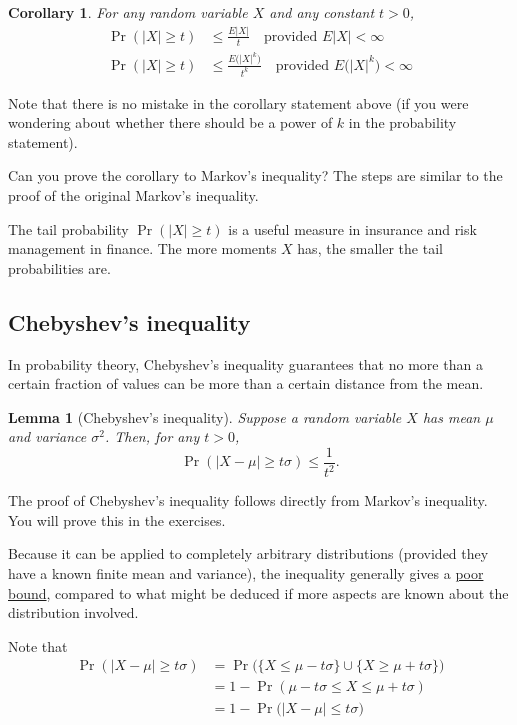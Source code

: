 \documentclass[
]{book}
\newtheorem{lemma}{Lemma}[chapter]
\newtheorem{corollary}{Corollary}[chapter]
\theoremstyle{definition}
\theoremstyle{definition}
\theoremstyle{definition}
\theoremstyle{definition}
\theoremstyle{remark}
\begin{document}
\begin{corollary}
For any random variable \(X\) and any constant \(t>0\), \[\begin{aligned}
      \Pr(|X|\geq t) &\leq \frac{E|X|}{t} \ \ \ \text{ provided } E|X|<\infty \\
      \Pr(|X|\geq t) &\leq \frac{E\big(|X|^k\big)}{t^k} \ \ \ \text{ provided } E\big(|X|^k\big)<\infty
    \end{aligned}\]
\end{corollary}

Note that there is no mistake in the corollary statement above (if you were wondering about whether there should be a power of \(k\) in the probability statement).

Can you prove the corollary to Markov's inequality? The steps are similar to the proof of the original Markov's inequality.

The tail probability \(\Pr(|X|\geq t)\) is a useful measure in insurance and
risk management in finance. The more moments \(X\) has, the smaller the
tail probabilities are.

\hypertarget{chebyshevs-inequality}{%
\subsection{Chebyshev's inequality}\label{chebyshevs-inequality}}

In probability theory, Chebyshev's inequality guarantees that no more
than a certain fraction of values can be more than a certain distance
from the mean.

\begin{lemma}[Chebyshev's inequality]
Suppose a random variable \(X\) has mean \(\mu\) and variance \(\sigma^2\). Then, for any
\(t>0\), \[\Pr(|X-\mu| \geq t\sigma) \leq \frac{1}{t^2}.\]
\end{lemma}

The proof of Chebyshev's inequality follows directly from Markov's inequality. You will prove this in the exercises.

Because it can be applied to completely arbitrary distributions (provided they have a known finite mean and variance), the inequality generally gives a \uline{poor bound}, compared to what might be deduced if more aspects are known about the distribution involved.

Note that
\begin{align*}
\Pr(|X-\mu| \geq t\sigma)
&= \Pr\big(\{ X \leq \mu - t\sigma \} \cup \{ X \geq \mu + t\sigma \}\big) \\
&= 1 - \Pr( \mu - t\sigma \leq X \leq \mu + t\sigma ) \\
&= 1 - \Pr\big(|X-\mu| \leq t\sigma\big)
\end{align*}
\end{document}
